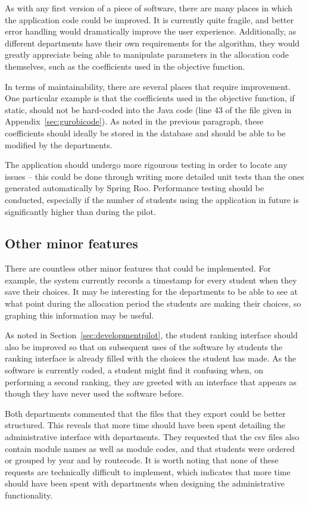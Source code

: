 As with any first version of a piece of software, there are many places in
which the application code could be improved. It is currently quite fragile,
and better error handling would dramatically improve the user experience.
Additionally, as different departments have their own requirements for the
algorithm, they would greatly appreciate being able to manipulate parameters
in the allocation code themselves, such as the coefficients used in the
objective function.

In terms of maintainability, there are several places that require
improvement. One particular example is that the coefficients used in the
objective function, if static, should not be hard-coded into the Java code
(line 43 of the file given in Appendix~\ref{sec:gurobicode}). As noted in the
previous paragraph, these coefficients should ideally be stored in the
database and should be able to be modified by the departments.

The application should undergo more rigourous testing in order to locate any
issues -- this could be done through writing more detailed unit tests than the
ones generated automatically by Spring Roo. Performance testing should be
conducted, especially if the number of students using the application in
future is significantly higher than during the pilot.

\subsection{Other minor features}

There are countless other minor features that could be implemented. For
example, the system currently records a timestamp for every student when they
save their choices. It may be interesting for the departments to be able to
see at what point during the allocation period the students are making their
choices, so graphing this information may be useful.

As noted in Section~\ref{sec:developmentpilot}, the student ranking interface
should also be improved so that on subsequent uses of the software by students
the ranking interface is already filled with the choices the student has made.
As the software is currently coded, a student might find it confusing when, on
performing a second ranking, they are greeted with an interface that appears
as though they have never used the software before.

Both departments commented that the files that they export could be better
structured. This reveals that more time should have been spent detailing the
administrative interface with departments. They requested that the \gls{csv}
files also contain module names as well as module codes, and that students
were ordered or grouped by year and by \gls{routecode}. It is worth noting
that none of these requests are technically difficult to implement, which
indicates that more time should have been spent with departments when
designing the administrative functionality.
